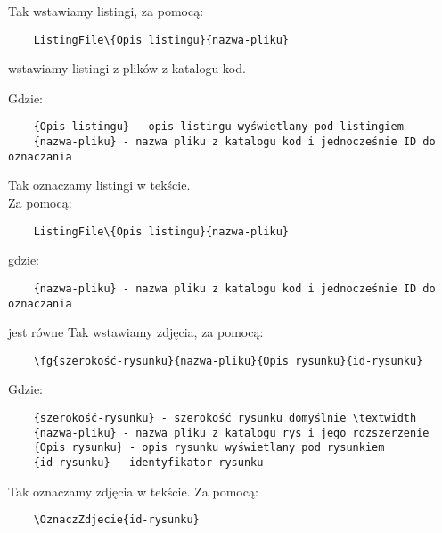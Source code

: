 

Tak wstawiamy listingi, za pomocą:

  \begin{verbatim}
	ListingFile\{Opis listingu}{nazwa-pliku} 
 \end{verbatim}
	
	wstawiamy listingi z plików z katalogu kod.

Gdzie:
\begin{verbatim}
	{Opis listingu} - opis listingu wyświetlany pod listingiem
	{nazwa-pliku} - nazwa pliku z katalogu kod i jednocześnie ID do oznaczania
\end{verbatim}

Tak oznaczamy listingi  w tekście.\\Za pomocą:

\begin{verbatim}
	ListingFile\{Opis listingu}{nazwa-pliku} 
\end{verbatim}

gdzie:

\begin{verbatim}
	{nazwa-pliku} - nazwa pliku z katalogu kod i jednocześnie ID do oznaczania
\end{verbatim}



\clearpage


jest równe 
\clearpage
Tak wstawiamy zdjęcia, za pomocą:

  \begin{verbatim}
	\fg{szerokość-rysunku}{nazwa-pliku}{Opis rysunku}{id-rysunku} 
 \end{verbatim}

 Gdzie:
\begin{verbatim}
	{szerokość-rysunku} - szerokość rysunku domyślnie \textwidth
	{nazwa-pliku} - nazwa pliku z katalogu rys i jego rozszerzenie
	{Opis rysunku} - opis rysunku wyświetlany pod rysunkiem
	{id-rysunku} - identyfikator rysunku
\end{verbatim}

 Tak oznaczamy zdjęcia  w tekście. Za pomocą:

  \begin{verbatim}
	\OznaczZdjecie{id-rysunku}
	\end{verbatim}



